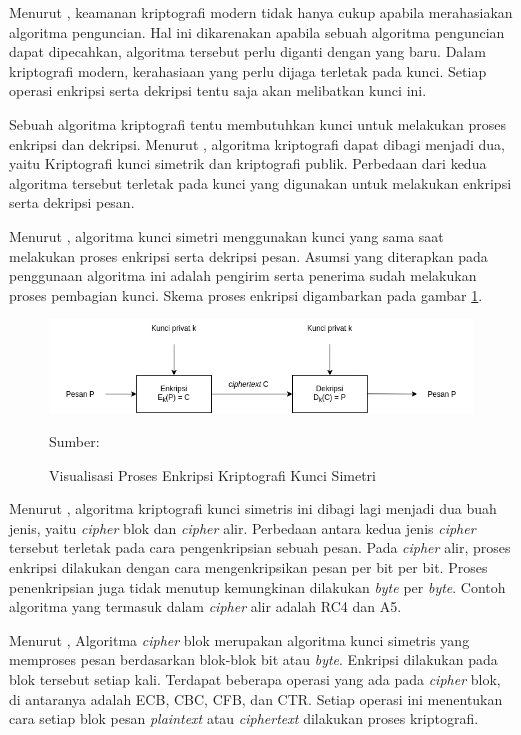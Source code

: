 Menurut \textcite{schneier1996}, keamanan kriptografi modern tidak hanya cukup apabila merahasiakan algoritma penguncian. Hal ini dikarenakan apabila sebuah algoritma penguncian dapat dipecahkan, algoritma tersebut perlu diganti dengan yang baru. Dalam kriptografi modern, kerahasiaan yang perlu dijaga terletak pada kunci. Setiap operasi enkripsi serta dekripsi tentu saja akan melibatkan kunci ini. 

Sebuah algoritma kriptografi tentu membutuhkan kunci untuk melakukan proses enkripsi dan dekripsi. Menurut \textcite{schneier1996}, algoritma kriptografi dapat dibagi menjadi dua, yaitu Kriptografi kunci simetrik dan kriptografi publik. Perbedaan dari kedua algoritma tersebut terletak pada kunci yang digunakan untuk melakukan enkripsi serta dekripsi pesan. 

Menurut \textcite{munir2019}, algoritma kunci simetri menggunakan kunci yang sama saat melakukan proses enkripsi serta dekripsi pesan. Asumsi yang diterapkan pada penggunaan algoritma ini adalah pengirim serta penerima sudah melakukan proses pembagian kunci. Skema proses enkripsi digambarkan pada gambar \ref{fig:crypto.symetric}.

\begin{figure}[!h]
  \centering
  \includegraphics[width=\textwidth]{chapters/res/chapter-2/img/crypto.symetric.png}
  \caption{Visualisasi Proses Enkripsi Kriptografi Kunci Simetri} \label{fig:crypto.symetric}
  Sumber: \textcite{munir2019}
\end{figure}

Menurut \textcite{munir2019}, algoritma kriptografi kunci simetris ini dibagi lagi menjadi dua buah jenis, yaitu \emph{cipher} blok dan \emph{cipher} alir. Perbedaan antara kedua jenis \emph{cipher} tersebut terletak pada cara pengenkripsian sebuah pesan. Pada \emph{cipher} alir, proses enkripsi dilakukan dengan cara mengenkripsikan pesan per bit per bit. Proses penenkripsian juga tidak menutup kemungkinan dilakukan \emph{byte} per \emph{byte}. Contoh algoritma yang termasuk dalam \emph{cipher} alir adalah RC4 dan A5.

Menurut \textcite{munir2019}, Algoritma \emph{cipher} blok merupakan algoritma kunci simetris yang memproses pesan berdasarkan blok-blok bit atau \emph{byte}. Enkripsi dilakukan pada blok tersebut setiap kali. Terdapat beberapa operasi yang ada pada \emph{cipher} blok, di antaranya adalah ECB, CBC, CFB, dan CTR. Setiap operasi ini menentukan cara setiap blok pesan \emph{plaintext} atau \emph{ciphertext} dilakukan proses kriptografi.



